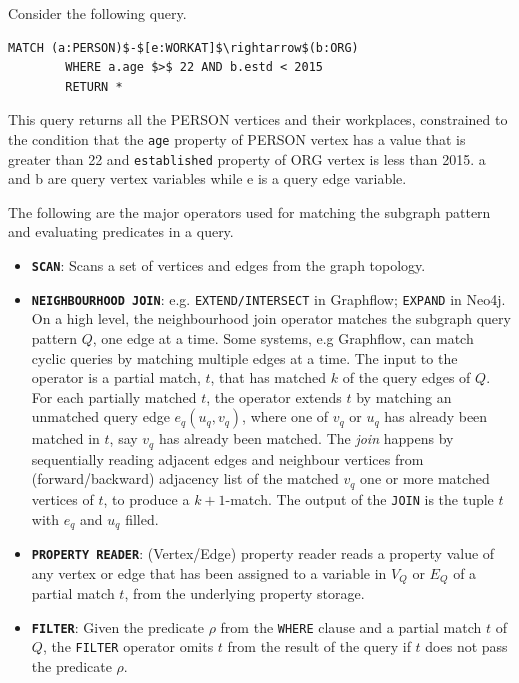 \begin{example}
	\vspace{5pt}
	\label{ex:cypher-example}
	Consider the following query. 
	{\em 
		\begin{lstlisting}[numbers=none,  showstringspaces=false,belowskip=0pt ]
		MATCH (a:PERSON)$-$[e:WORKAT]$\rightarrow$(b:ORG)
		WHERE a.age $>$ 22 AND b.estd < 2015
		RETURN *\end{lstlisting}
	}
	This query returns all the PERSON vertices and their workplaces, constrained to the condition that the \textsc{}\texttt{age}\textsc{} property of PERSON vertex has a value that is greater than 22 and \textsc{}\texttt{established}\textsc{} property of ORG vertex is less than 2015. a and b are query vertex variables while e is a query edge variable.
\end{example}
\vspace{-5pt}

The following are the major operators used for matching the subgraph pattern and evaluating predicates in a query.

\begin{itemize}
	
	\item \textbf{\texttt{SCAN}}: Scans a set of vertices and edges from the graph topology.
	
	\item \textbf{\texttt{NEIGHBOURHOOD JOIN}}: e.g. \texttt{EXTEND/INTERSECT} in Graphflow; \texttt{EXPAND} in Neo4j. On a high level, the neighbourhood join operator matches the subgraph query pattern $Q$, one edge at a time. Some systems, e.g Graphflow, can match cyclic queries by matching multiple edges at a time. The input to the operator is a partial match, $t$, that has matched $k$ of the query edges of $Q$. For each partially matched $t$, the operator extends $t$ by matching an unmatched query edge $e_q(u_q, v_q)$, where one of $v_q$ or $u_q$ has already been matched in $t$, say $v_q$ has already been matched. The \emph{join} happens by sequentially reading adjacent edges and neighbour vertices from (forward/backward) adjacency list of the matched $v_q$ one or more matched vertices of $t$, to produce a $k+1$-match. The output of the \texttt{JOIN} is the tuple $t$ with $e_q$ and $u_q$ filled.
	
	\item \textbf{\texttt{PROPERTY READER}}: (Vertex/Edge) property reader reads a property value of any vertex or edge that has been assigned to a variable in $V_Q$ or $E_Q$ of a partial match $t$, from the underlying property storage. 
	
	\item \textbf{\texttt{FILTER}}: Given the predicate $\rho$ from the \texttt{WHERE} clause and a partial match $t$ of $Q$, the \texttt{FILTER} operator omits $t$ from the result of the query if $t$ does not pass the predicate $\rho$.
	
\end{itemize}

